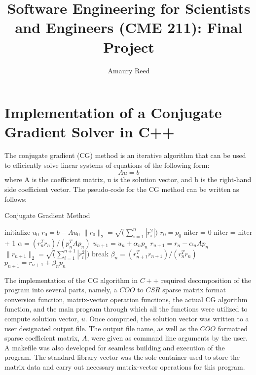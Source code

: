 \documentclass{homework}
\title{Software Engineering for Scientists and Engineers (CME 211): Final Project}
\author{Amaury Reed}
\begin{document}
\maketitle

\section{Implementation of a Conjugate Gradient Solver in C++}
The conjugate gradient (CG) method is an iterative algorithm that can be used to efficiently solve linear systems of equations of the following form: 
\begin{equation}
    Au = b
\end{equation}
where A is the coefficient matrix, u is the solution vector, and b is the right-hand side coefficient vector. The pseudo-code for the CG method can be written as follows:
\begin{algorithm}
\caption{Conjugate Gradient Method}
\label{<your label for references later in your document>}
\begin{algorithmic}
\State initialize $u_{0}$ 
\State $r_{0} = b - Au_{0}$ 
\State $\|r_{0}\|_{2} = \sqrt(\sum_{i=1}^{n}|r_{i}^2|)$ 
\State $r_{0} = p_{0}$ 
\State niter = 0 
    \State niter = niter + 1 
    \State $\alpha = (r_{n}^{T}r_{n})/ (p_{n}^{T}Ap_{n})$ 
    \State $u_{n+1} = u_{n} + \alpha_{n} p_{n}$ 
    \State $r_{n+1} = r_{n} - \alpha_{n}Ap_{n}$ 
    \State $\|r_{n+1}\|_{2} = \sqrt(\sum_{i=1}^{n+1}|r_{i}^2|)$ 
        \State break
    \EndIf
    \State $\beta_{n} = (r_{n+1}^{T}r_{n+1})/(r_{n}^{T}r_{n}) $ 
    \State $p_{n+1} = r_{n+1} + \beta_{n} p_{n}$
\EndWhile
\end{algorithmic}
\end{algorithm}

The implementation of the CG algorithm in $C++$ required decomposition of the program into several parts, namely, a $COO$ to $CSR$ sparse matrix format conversion function, matrix-vector operation functions, the actual CG algorithm function, and the main program through which all the functions were utilized to compute solution vector, $u$. Once computed, the solution vector was written to a user designated output file. The output file name, as well as the $COO$ formatted sparse coefficient matrix, $A$, were given as command line arguments by the user. A makefile was also developed for seamless building and execution of the program. The standard library vector was the sole container used to store the matrix data and carry out necessary matrix-vector operations for this program. 
\end{document}
